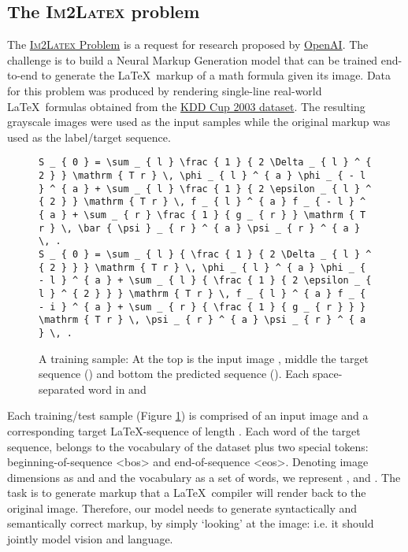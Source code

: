 \documentclass{article}
\begin{document}
\subsection{The \textsc{Im2Latex} problem}
\label{the_problem}
The \href{https://openai.com/requests-for-research/#im2latex}{\textsc{Im2Latex} Problem} is a request for research
proposed by \href{https://openai.com}{OpenAI}. The challenge is to build a Neural Markup
Generation model that can be trained end-to-end to generate the \LaTeX ~markup of a math formula given its image.
Data for this problem was produced by rendering single-line real-world \LaTeX  ~formulas obtained from the \href{http://www.cs.cornell.edu/projects/kddcup/datasets.html}{KDD Cup 2003 dataset}. The resulting grayscale images were used as the input samples while the original markup was used as the label/target sequence.
\lstset{basicstyle=\tiny}
\begin{figure}[!h]
	
	\lstinline|S _ { 0 } = \sum _ { l } \frac { 1 } { 2 \Delta _ { l } ^ { 2 } } \mathrm { T r } \, \phi _ { l } ^ { a } \phi _ { - l } ^ { a } + \sum _ { l } \frac { 1 } { 2 \epsilon _ { l } ^ { 2 } } \mathrm { T r } \, f _ { l } ^ { a } f _ { - l } ^ { a } + \sum _ { r } \frac { 1 } { g _ { r } } \mathrm { T r } \, \bar { \psi } _ { r } ^ { a } \psi _ { r } ^ { a } \, .| \\
		
	\lstinline|S _ { 0 } = \sum _ { l } { \frac { 1 } { 2 \Delta _ { l } ^ { 2 } } } \mathrm { T r } \, \phi _ { l } ^ { a } \phi _ { - l } ^ { a } + \sum _ { l } { \frac { 1 } { 2 \epsilon _ { l } ^ { 2 } } } \mathrm { T r } \, f _ { l } ^ { a } f _ { - i } ^ { a } + \sum _ { r } { \frac { 1 } { g _ { r } } } \mathrm { T r } \, \psi _ { r } ^ { a } \psi _ { r } ^ { a } \, .|
	\caption{A training sample: At the top is the input image , middle the target sequence  () and bottom the predicted sequence  (). Each space-separated word in  and    }
	\label{fig-sample}
\end{figure}
Each training/test sample (Figure \ref{fig-sample}) is comprised of an input image   and a corresponding target \LaTeX -sequence  of length . Each word  of the target sequence, belongs to the vocabulary of the dataset plus two special tokens: beginning-of-sequence <bos> and end-of-sequence <eos>. Denoting image dimensions as  and  and the vocabulary as a set  of  words, we represent \smash{}, \smash{} and \smash{}.
The task is to generate markup that a \LaTeX ~compiler will render back to the original image. Therefore, our model needs to generate syntactically and semantically correct markup, by simply `looking' at the image: i.e. it should jointly model vision and language.
\end{document}
